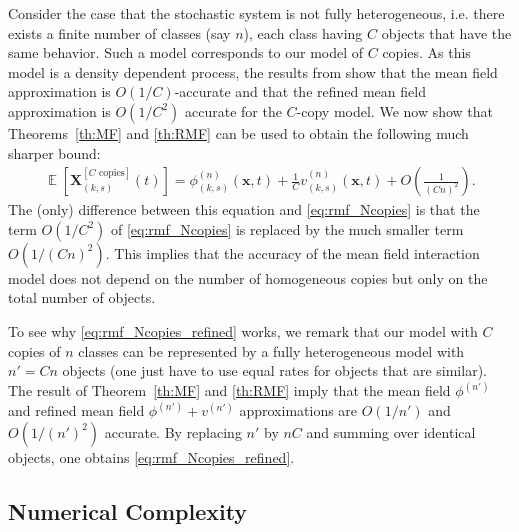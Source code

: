 \documentclass[acmsmall]{acmart}
\newcommand\bx{\mathbf{x}}
\newcommand\toN{^{(n)}}
\newcommand{\ncopies}{^{[C\text{ copies}]}}
\DeclareMathOperator{\E}{\mathbb{E}} %
\newcommand\esp[1]{\E\left[#1\right]} %
\newcommand\p[1]{\left(#1\right)} %
\begin{document}
Consider the case that the stochastic system is not fully heterogeneous, i.e. there exists a finite number of classes (say $n$), each class having $C$ objects that have the same behavior. Such a model corresponds to our model of $C$ copies. As this model is a density dependent process, the results from \cite{gast2017refined,gastSizeExpansionsMean2019} show that the mean field approximation is $O(1/C)$-accurate and that the refined mean field approximation is $O(1/C^2)$ accurate for the $C$-copy model.  We now show that Theorems~\ref{th:MF} and \ref{th:RMF} can be used to obtain the following much sharper bound:
\begin{align}
  \label{eq:rmf_Ncopies_refined}
  \esp{\mathbf{X}\ncopies_{(k,s)}(t)} = \phi\toN_{(k,s)}(\bx,t) + \frac1C v\toN_{(k,s)}(\bx,t) + O\p{\frac{1}{(Cn)^2}}.
\end{align}
The (only) difference between this equation and \eqref{eq:rmf_Ncopies} is that the term $O(1/C^2)$ of \eqref{eq:rmf_Ncopies} is replaced by the much smaller term $O(1/(Cn)^2)$. This implies that the accuracy of the mean field interaction model does not depend on the number of homogeneous copies but only on the total number of objects. 

To see why \eqref{eq:rmf_Ncopies_refined} works, we remark that our model with $C$ copies of $n$ classes can be represented by a fully heterogeneous model with $n'=Cn$ objects (one just have to use equal rates for objects that are similar). The result of Theorem~\ref{th:MF} and \ref{th:RMF} imply that the mean field $\phi^{(n')}$ and refined mean field $\phi^{(n')}+v^{(n')}$ approximations are $O(1/n')$ and $O(1/(n')^2)$ accurate.  By replacing $n'$ by $nC$ and summing over identical objects, one obtains \eqref{eq:rmf_Ncopies_refined}.


\subsection{Numerical Complexity}
\label{sec:numerical_complexity}
\end{document}
